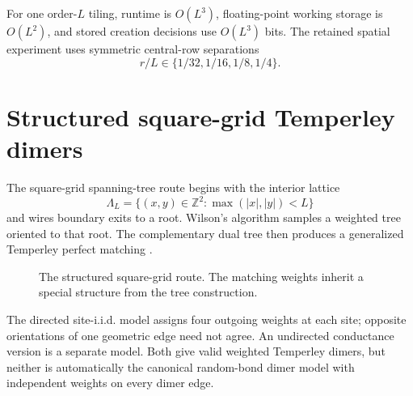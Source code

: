 \documentclass[11pt,a4paper,oneside,openany]{memoir}
\newcommand{\1}{\bm{1}}
\begin{document}
For one order-$L$ tiling, runtime is $O(L^3)$, floating-point working storage
is $O(L^2)$, and stored creation decisions use $O(L^3)$ bits. The retained
spatial experiment uses symmetric central-row separations
\[
  r/L\in\{1/32,1/16,1/8,1/4\}.
\]

\section{Structured square-grid Temperley dimers}

The square-grid spanning-tree route begins with the interior lattice
\[
  \Lambda_L=\{(x,y)\in\mathbb{Z}^2:\max(|x|,|y|)<L\}
\]
and wires boundary exits to a root. Wilson's algorithm samples a weighted tree
oriented to that root. The complementary dual tree then produces a generalized
Temperley perfect matching \cite{KPW2000}.

\begin{figure}[H]
\centering
{}
\caption{The structured square-grid route. The matching weights inherit a special structure from the tree construction.}
\end{figure}

The directed site-i.i.d. model assigns four outgoing weights at each site;
opposite orientations of one geometric edge need not agree. An undirected
conductance version is a separate model. Both give valid weighted Temperley
dimers, but neither is automatically the canonical random-bond dimer model
with independent weights on every dimer edge.
\end{document}

